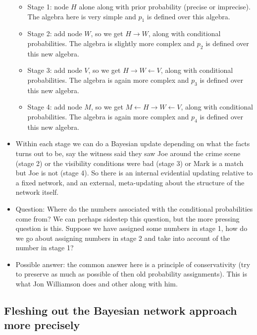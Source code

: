 \documentclass[
  11pt,
  dvipsnames,enabledeprecatedfontcommands]{scrartcl}
\begin{document}
\begin{itemize}
  \begin{itemize}
  \item
    Stage 1: node \(H\) alone along with prior probability (precise or
    imprecise). The algebra here is very simple and \(p_1\) is defined
    over this algebra.
  \item
    Stage 2: add node \(W\), so we get \(H \rightarrow W\), along with
    conditional probabilities. The algebra is slightly more complex and
    \(p_2\) is defined over this new algebra.
  \item
    Stage 3: add node \(V\), so we get \(H \rightarrow W \leftarrow V\),
    along with conditional probabilities. The algebra is again more
    complex and \(p_3\) is defined over this new algebra.
  \item
    Stage 4: add node \(M\), so we get
    \(M \leftarrow H \rightarrow W \leftarrow V\), along with
    conditional probabilities. The algebra is again more complex and
    \(p_4\) is defined over this new algebra.
  \end{itemize}
\item
  Within each stage we can do a Bayesian update depending on what the
  facts turns out to be, say the witness said they saw Joe around the
  crime scene (stage 2) or the visibility conditions were bad (stage 3)
  or Mark is a match but Joe is not (stage 4). So there is an internal
  evidential updating relative to a fixed network, and an external,
  meta-updating about the structure of the network itself.
\item
  Question: Where do the numbers associated with the conditional
  probabilities come from? We can perhaps sidestep this question, but
  the more pressing question is this. Suppose we have assigned some
  numbers in stage 1, how do we go about assigning numbers in stage 2
  and take into account of the number in stage 1?
\item
  Possible answer: the common answer here is a principle of
  conservativity (try to preserve as much as possible of then old
  probability assignments). This is what Jon Williamson does and other
  along with him.
\end{itemize}

\hypertarget{fleshing-out-the-bayesian-network-approach-more-precisely}{%
\subsection{Fleshing out the Bayesian network approach more
precisely}\label{fleshing-out-the-bayesian-network-approach-more-precisely}}
\end{document}

